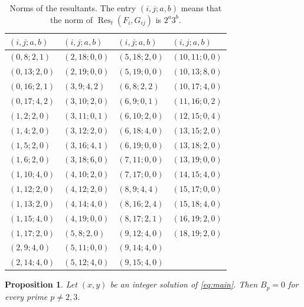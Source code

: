 \documentclass[11pt]{article}
\newtheorem{proposition}[theorem]{Proposition}
\begin{document}
\begin{table}[htbp]
\centering\small
\setlength{\tabcolsep}{4pt}
\renewcommand{\arraystretch}{1.12}
\caption{Norms of the resultants. The entry $(i,j;a,b)$ means that the norm of $\operatorname{Res}_t(F_i,G_{ij})$ is $2^a3^b$.}\label{tab:resultants}
\begin{tabular}{@{}llll@{}}
			\toprule
			$(i,j;a,b)$ & $(i,j;a,b)$ & $(i,j;a,b)$ & $(i,j;a,b)$\\\midrule
		$(0,8;2,1)$ & $(2,18;0,0)$ & $(5,18;2,0)$ & $(10,11;0,0)$\\
		$(0,13;2,0)$ & $(2,19;0,0)$ & $(5,19;0,0)$ & $(10,13;8,0)$\\
		$(0,16;2,1)$ & $(3,9;4,2)$ & $(6,8;2,2)$ & $(10,17;4,0)$\\
		$(0,17;4,2)$ & $(3,10;2,0)$ & $(6,9;0,1)$ & $(11,16;0,2)$\\
		$(1,2;2,0)$ & $(3,11;0,1)$ & $(6,10;2,0)$ & $(12,15;0,4)$\\
		$(1,4;2,0)$ & $(3,12;2,0)$ & $(6,18;4,0)$ & $(13,15;2,0)$\\
		$(1,5;2,0)$ & $(3,16;4,1)$ & $(6,19;0,0)$ & $(13,18;2,0)$\\
		$(1,6;2,0)$ & $(3,18;6,0)$ & $(7,11;0,0)$ & $(13,19;0,0)$\\
		$(1,10;4,0)$ & $(4,10;2,0)$ & $(7,17;0,0)$ & $(14,15;4,0)$\\
		$(1,12;2,0)$ & $(4,12;2,0)$ & $(8,9;4,4)$ & $(15,17;0,0)$\\
		$(1,13;2,0)$ & $(4,14;4,0)$ & $(8,16;2,4)$ & $(15,18;4,0)$\\
		$(1,15;4,0)$ & $(4,19;0,0)$ & $(8,17;2,1)$ & $(16,19;2,0)$\\
		$(1,17;2,0)$ & $(5,8;2,0)$ & $(9,12;4,0)$ & $(18,19;2,0)$\\
		$(2,9;4,0)$ & $(5,11;0,0)$ & $(9,14;4,0)$ & \\
		$(2,14;4,0)$ & $(5,12;4,0)$ & $(9,15;4,0)$ & \\
			\bottomrule
		\end{tabular}
\end{table}

\begin{proposition}\label{prop:good}
Let $(x,y)$ be an integer solution of \eqref{eq:main}. Then $B_p=0$ for every prime $p\neq2,3$.
\end{proposition}
\end{document}
